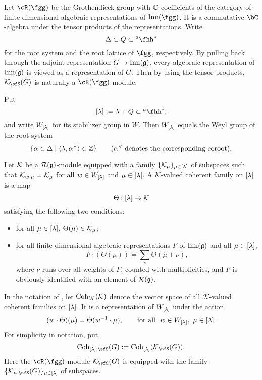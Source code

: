 \documentclass[counting_main.tex]{subfiles}
\begin{document}
Let $\Rg$ be the Grothendieck group with
$\mathbb{C}$-coefficients of the category of finite-dimensional algebraic
representations of $\mathrm{Inn}(\fgg)$. It is 
 a commutative $\bC$-algebra under the tensor
products of the representations. 
Write \[
\Delta\subset Q\subset \hha^*
\] for the root system and the root lattice of
$\fgg$, respectively.
By pulling back through the adjoint representation
$G\rightarrow \mathrm{Inn}(\mathfrak g)$, every algebraic representation of $\mathrm{Inn}(\mathfrak g)$ is viewed as a representation of $G$.  
Then by using the tensor products,
$\CK_\sfS(G)$ is naturally a $\Rg$-module.






Put 
\[
\Lam:=\lambda+Q\subset \hha^*,
\]
 and write $W_{[\lambda]}$
for its stabilizer group in $W$. Then $W_{[\lambda]}$ equals the Weyl group of the root
system
\[
  \{\alpha \in \Delta\mid \langle \lambda, \alpha^\vee\rangle \in \mathbb{Z}\}\qquad (\alpha^\vee \textrm{ denotes the corresponding coroot}).
\]


\begin{defn}\label{defcoh}
  Let ${\mathcal {K}}$ be a $\mathcal R(\mathfrak g)$-module equipped with a family
  $\{{\mathcal {K}}_\mu\}_{\mu\in {[\lambda]}}$ of subspaces such that ${\mathcal {K}}_{w\cdot \mu}={\mathcal {K}}_\mu$
  for all $w\in W_{[\lambda]}$ and $\mu\in {[\lambda]}$. A ${\mathcal {K}}$-valued coherent family on
  ${[\lambda]}$ is a map
  \[
    \Theta: \Lam\rightarrow \CK%
  \]
  satisfying the following two conditions:
  \begin{itemize}
    \item for all $\mu\in {[\lambda]}$, $\Theta(\mu)\in {\mathcal {K}}_\mu$;
    \item for all finite-dimensional algebraic representations $F$ of $\mathrm{Inn}(\mathfrak g)$
          and all $\mu\in {[\lambda]}$,
          \[
          F\cdot (\Theta(\mu)) = \sum_{\nu} \Theta(\mu+\nu),
          \]
          where $\nu$ runs over all weights of $F$, counted with multiplicities,
          and $F$ is obviously identified with an element of $\mathcal R(\mathfrak g)$.
  \end{itemize}
\end{defn}


In the notation of , let $\mathrm{Coh}_{{[\lambda]}}({\mathcal {K}})$ denote the
vector space of all $\mathcal K$-valued coherent families on ${[\lambda]}$. It is a
representation of $W_{{[\lambda]}}$ under the action
\[
  (w\cdot \Theta)(\mu) = \Theta(w^{-1}\cdot \mu), \qquad \textrm{for all
  }\ w\in W_{[\lambda]}, \ \mu\in {[\lambda]}.
\]
For simplicity in notation, put
\[
  \Coh_{\Lam,\sfS}(G):=\Coh_{\Lam}(\CK_\sfS(G)).
\]
Here the $\Rg$-module $\CK_\sfS(G)$ is equipped with the family $\{\CK_{\mu, \sfS}(G)\}_{\mu\in \Lam}$ of subspaces. 
\end{document}
